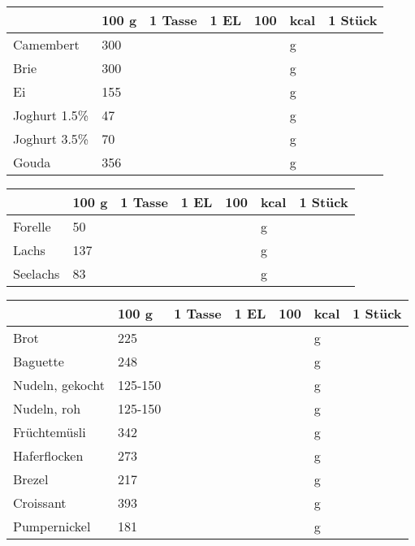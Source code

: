 \begin{tabularx}{\linewidth}{X|l|r|r|rl|r}
                  &   100 g & 1 Tasse & 1 EL &      100 & kcal    & 1 Stück  \\
\hline
Camembert         &     300 &         &      &          & g       &          \\
Brie              &     300 &         &      &          & g       &          \\
Ei                &     155 &         &      &          & g       &          \\
Joghurt 1.5\%     &      47 &         &      &          & g       &          \\
Joghurt 3.5\%     &      70 &         &      &          & g       &          \\
Gouda             &     356 &         &      &          & g       &          \\
\end{tabularx}
\begin{tabularx}{\linewidth}{X|l|r|r|rl|r}
                  &   100 g & 1 Tasse & 1 EL &      100 & kcal    & 1 Stück  \\
\hline
Forelle           &      50 &         &      &          & g       &          \\
Lachs             &     137 &         &      &          & g       &          \\
Seelachs          &      83 &         &      &          & g       &          \\
\end{tabularx}
\begin{tabularx}{\linewidth}{X|l|r|r|rl|r}
                  &   100 g & 1 Tasse & 1 EL &      100 & kcal    & 1 Stück  \\
\hline
Brot              &     225 &         &      &          & g       &          \\
Baguette          &     248 &         &      &          & g       &          \\
Nudeln, gekocht   & 125-150 &         &      &          & g       &          \\
Nudeln, roh       & 125-150 &         &      &          & g       &          \\
Früchtemüsli      &     342 &         &      &          & g       &          \\
Haferflocken      &     273 &         &      &          & g       &          \\
Brezel            &     217 &         &      &          & g       &          \\
Croissant         &     393 &         &      &          & g       &          \\
Pumpernickel      &     181 &         &      &          & g       &          \\
\end{tabularx}

